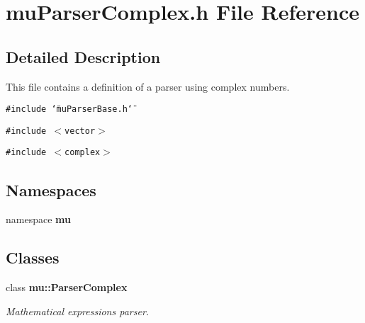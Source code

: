 \section{muParserComplex.h File Reference}
\label{muParserComplex_8h}


\subsection{Detailed Description}
This file contains a definition of a parser using complex numbers. 



{\tt \#include \char`\"{}muParserBase.h\char`\"{}}\par
{\tt \#include $<$vector$>$}\par
{\tt \#include $<$complex$>$}\par
\subsection*{Namespaces}
\begin{CompactItemize}
\item 
namespace {\bf mu}
\end{CompactItemize}
\subsection*{Classes}
\begin{CompactItemize}
\item 
class {\bf mu::ParserComplex}
\begin{CompactList}\small\item\em Mathematical expressions parser. \item\end{CompactList}\end{CompactItemize}
